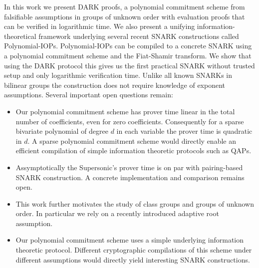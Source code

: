 In this work we present DARK proofs, a polynomial commitment scheme from falsifiable assumptions in groups of unknown order with evaluation proofs that can be verified in logarithmic time. We also present a unifying information-theoretical framework underlying several recent SNARK constructions called Polynomial-IOPs. Polynomial-IOPs can be compiled to a concrete SNARK using a polynomial commitment scheme and the Fiat-Shamir transform. We show that using the DARK protocol this gives us the first practical SNARK without
trusted setup and only logarithmic verification time. Unlike all known SNARKs in bilinear groups the construction does not require knowledge of exponent assumptions.
Several important open questions remain:

\begin{itemize}
    \item Our polynomial commitment scheme has prover time linear in the total number of coefficients, even for zero coefficients. Consequently for a sparse bivariate polynomial of degree $d$ in each variable the prover time is quadratic in $d$. A sparse polynomial commitment scheme would directly enable an efficient compilation of simple information theoretic protocols such as QAPs.
    \item Assymptotically the Supersonic's prover time is on par with pairing-based SNARK construction. A concrete implementation and comparison remains open.
    \item This work further motivates the study of class groups and groups of unknown order. In particular we rely on a recently introduced adaptive root assumption.
    \item Our polynomial commitment scheme uses a simple underlying information theoretic protocol. Different cryptographic compilations of this scheme under different assumptions would directly yield interesting SNARK constructions. 
\end{itemize}


